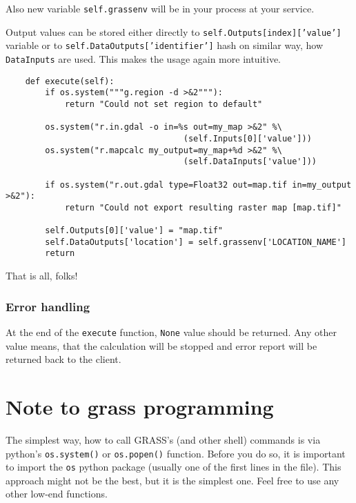 \documentclass[a4paper,11pt]{article}
\begin{document}
    Also new variable \texttt{self.grassenv} will be in your process at your service.

    Output values can be stored either directly to \texttt{self.Outputs[index]['value']} variable or to \texttt{self.DataOutputs['identifier']} hash on similar way, how \texttt{DataInputs} are used. This makes the usage again more intuitive.

    \begin{verbatim}
    def execute(self):
        if os.system("""g.region -d >&2"""):
            return "Could not set region to default"

        os.system("r.in.gdal -o in=%s out=my_map >&2" %\
                                    (self.Inputs[0]['value']))
        os.system("r.mapcalc my_output=my_map+%d >&2" %\
                                    (self.DataInputs['value']))
        
        if os.system("r.out.gdal type=Float32 out=map.tif in=my_output >&2"):
            return "Could not export resulting raster map [map.tif]"

        self.Outputs[0]['value'] = "map.tif"
        self.DataOutputs['location'] = self.grassenv['LOCATION_NAME']
        return
    \end{verbatim}

     
    That is all, folks!
     

    \subsubsection{Error handling}
     
    At the end of the \texttt{execute} function, \texttt{None} value should be returned. Any other 
    value means, that the calculation will be stopped and error report will be returned back to the client.
     


    \section{Note to grass programming}
     
    The simplest way, how to call GRASS's (and other shell) commands is via
    python's \texttt{os.system()} or \texttt{os.popen()} function. 
    Before you do so, it is important to import
    the \texttt{os} python package (usually one of the first lines in the file). This
    approach might not be the best, but it is the simplest one. Feel free to use any other low-end functions.
     
\end{document}
